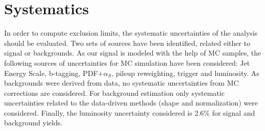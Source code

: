 \begin{table*}[htbH]
\begin{center}
\caption{Mean value and standard deviation from the linear fit, done using gaussian fit of MC mass points after the full selection. In the last column the yields for each mass point are presented from the integration around one sigma of the mean value from the linear fit. The error of the yields are presented as a percentage of the nominal value.\label{tab:LinearSignalWidths}}
\end{center}
\end{table*}

\section{Systematics}
\label{sec:sys}

In order to compute exclusion limits, the systematic uncertainties of the analysis should be evaluated. Two sets of sources have been identified, related either to signal or backgrounds. As our signal is modeled with the help of MC samples, the following sources of uncertainties for MC simulation have been considered: Jet Energy Scale, b-tagging, PDF+$\alpha_{S}$, pileup reweighting, trigger and luminosity. As backgrounds were derived from data, no systematic uncertainties from MC corrections are considered. For background estimation only systematic uncertainties related to the data-driven methods (shape and normalization) were considered. Finally, the luminosity uncertainty considered is 2.6\% for signal and background yields. 

